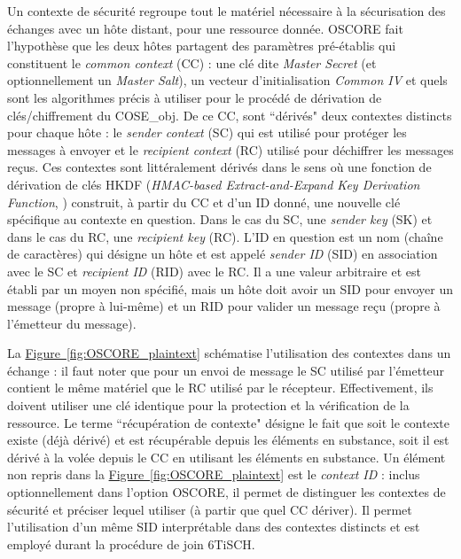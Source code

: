 \documentclass[]{report}
\newcommand{\wordlink}[2]{\hyperref[#2]{#1~\ref{#2}}}
\begin{document}
Un contexte de sécurité regroupe tout le matériel nécessaire à la sécurisation des échanges avec un hôte distant, pour une ressource donnée. OSCORE fait l'hypothèse que les deux hôtes partagent des paramètres pré-établis qui constituent le \textit{common context} (CC) : une clé dite \textit{Master Secret} (et optionnellement un \textit{Master Salt}), un vecteur d'initialisation \textit{Common IV} et quels sont les algorithmes précis à utiliser pour le procédé de dérivation de clés/chiffrement du COSE\_obj. De ce CC, sont ``dérivés" deux contextes distincts pour chaque hôte : le \textit{sender context} (SC) qui est utilisé pour protéger les messages à envoyer et le \textit{recipient context} (RC) utilisé pour déchiffrer les messages reçus. Ces contextes sont littéralement dérivés dans le sens où une fonction de dérivation de clés HKDF (\textit{HMAC-based Extract-and-Expand Key Derivation Function}, \cite{rfc5869}) construit, à partir du CC et d'un ID donné, une nouvelle clé spécifique au contexte en question. Dans le cas du SC, une \textit{sender key} (SK) et dans le cas du RC, une \textit{recipient key} (RC). L'ID en question est un nom (chaîne de caractères) qui désigne un hôte et est appelé \textit{sender ID} (SID) en association avec le SC et \textit{recipient ID} (RID) avec le RC. Il a une valeur arbitraire et est établi par un moyen non spécifié, mais un hôte doit avoir un SID pour envoyer un message (propre à lui-même) et un  RID pour valider un message reçu (propre à l'émetteur du message).\\

\par La \wordlink{Figure}{fig:OSCORE_plaintext} schématise l'utilisation des contextes dans un échange : il faut noter que pour un envoi de message le SC utilisé par l'émetteur contient le même matériel que le RC utilisé par le récepteur. Effectivement, ils doivent utiliser une clé identique pour la protection et la vérification de la ressource. Le terme ``récupération de contexte" désigne le fait que soit le contexte existe (déjà dérivé) et est récupérable depuis les éléments en substance, soit il est dérivé à la volée depuis le CC en utilisant les éléments en substance. Un élément non repris dans la \wordlink{Figure}{fig:OSCORE_plaintext} est le \textit{context ID} : inclus optionnellement dans l'option OSCORE, il permet de distinguer les contextes de sécurité et préciser lequel utiliser (à partir que quel CC dériver). Il permet l'utilisation d'un même SID interprétable dans des contextes distincts et est employé durant la procédure de join 6TiSCH. 
\vspace{0.1cm}
\end{document}
